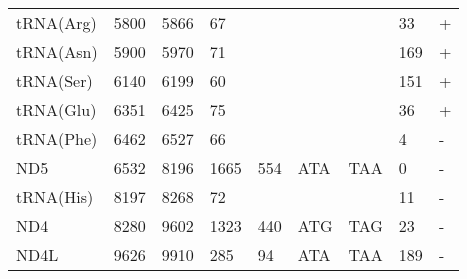 \documentclass[../DISSERTACAO_MAIN.tex]{subfiles}
\begin{document}
\begin{longtable}{llllllllllllllllllllll}
			tRNA(Arg)    & 5800           & \multicolumn{2}{l}{5866}  & \multicolumn{2}{l}{67}         & \multicolumn{3}{l}{}                          & \multicolumn{3}{l}{}              & \multicolumn{3}{l}{}      & \multicolumn{3}{l}{33}          & \multicolumn{4}{l}{+}                  \\
			tRNA(Asn)    & 5900           & \multicolumn{2}{l}{5970}  & \multicolumn{2}{l}{71}         & \multicolumn{3}{l}{}                          & \multicolumn{3}{l}{}              & \multicolumn{3}{l}{}      & \multicolumn{3}{l}{169}         & \multicolumn{4}{l}{+}                  \\
			tRNA(Ser)    & 6140           & \multicolumn{2}{l}{6199}  & \multicolumn{2}{l}{60}         & \multicolumn{3}{l}{}                          & \multicolumn{3}{l}{}              & \multicolumn{3}{l}{}      & \multicolumn{3}{l}{151}         & \multicolumn{4}{l}{+}                  \\
			tRNA(Glu)    & 6351           & \multicolumn{2}{l}{6425}  & \multicolumn{2}{l}{75}         & \multicolumn{3}{l}{}                          & \multicolumn{3}{l}{}              & \multicolumn{3}{l}{}      & \multicolumn{3}{l}{36}          & \multicolumn{4}{l}{+}                  \\
			tRNA(Phe)    & 6462           & \multicolumn{2}{l}{6527}  & \multicolumn{2}{l}{66}         & \multicolumn{3}{l}{}                          & \multicolumn{3}{l}{}              & \multicolumn{3}{l}{}      & \multicolumn{3}{l}{4}           & \multicolumn{4}{l}{-}                  \\
			ND5          & 6532           & \multicolumn{2}{l}{8196}  & \multicolumn{2}{l}{1665}       & \multicolumn{3}{l}{554}                       & \multicolumn{3}{l}{ATA}           & \multicolumn{3}{l}{TAA}   & \multicolumn{3}{l}{0}           & \multicolumn{4}{l}{-}                  \\
			tRNA(His)    & 8197           & \multicolumn{2}{l}{8268}  & \multicolumn{2}{l}{72}         & \multicolumn{3}{l}{}                          & \multicolumn{3}{l}{}              & \multicolumn{3}{l}{}      & \multicolumn{3}{l}{11}          & \multicolumn{4}{l}{-}                  \\
			ND4          & 8280           & \multicolumn{2}{l}{9602}  & \multicolumn{2}{l}{1323}       & \multicolumn{3}{l}{440}                       & \multicolumn{3}{l}{ATG}           & \multicolumn{3}{l}{TAG}   & \multicolumn{3}{l}{23}          & \multicolumn{4}{l}{-}                  \\
			ND4L         & 9626           & \multicolumn{2}{l}{9910}  & \multicolumn{2}{l}{285}        & \multicolumn{3}{l}{94}                        & \multicolumn{3}{l}{ATA}           & \multicolumn{3}{l}{TAA}   & \multicolumn{3}{l}{189}         & \multicolumn{4}{l}{-}                  \\

\end{longtable}
\end{document}
